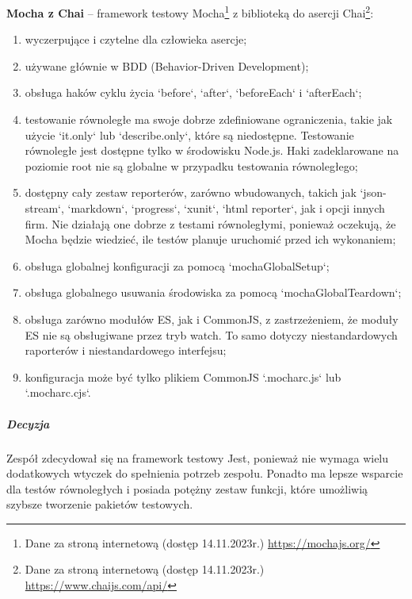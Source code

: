 \documentclass[12pt, a4paper, twoside, openany]{book}
\begin{document}
\textbf{Mocha z Chai} -- framework testowy Mocha\footnote{Dane za stroną internetową (dostęp 14.11.2023r.) \url{https://mochajs.org/}} z biblioteką do asercji Chai\footnote{Dane za stroną internetową (dostęp 14.11.2023r.) \url{https://www.chaijs.com/api/}}:
\begin{enumerate}[label=--]
    \item wyczerpujące i czytelne dla człowieka asercje;
    \item używane głównie w BDD (Behavior-Driven Development);
    \item obsługa haków cyklu życia `before`, `after`, `beforeEach` i `afterEach`;
    \item testowanie równoległe ma swoje dobrze zdefiniowane ograniczenia, takie jak użycie `it.only` lub `describe.only`, które są niedostępne. Testowanie równoległe jest dostępne tylko w środowisku Node.js. Haki zadeklarowane na poziomie root nie są globalne w przypadku testowania równoległego;
    \item dostępny cały zestaw reporterów, zarówno wbudowanych, takich jak `json-stream`, `markdown`, `progress`, `xunit`, `html reporter`, jak i opcji innych firm. Nie działają one dobrze z testami równoległymi, ponieważ oczekują, że Mocha będzie wiedzieć, ile testów planuje uruchomić przed ich wykonaniem;
    \item obsługa globalnej konfiguracji za pomocą `mochaGlobalSetup`;
    \item obsługa globalnego usuwania środowiska za pomocą `mochaGlobalTeardown`;
    \item obsługa zarówno modułów ES, jak i CommonJS, z zastrzeżeniem, że moduły ES nie są obsługiwane przez tryb watch. To samo dotyczy niestandardowych raporterów i niestandardowego interfejsu;
    \item konfiguracja może być tylko plikiem CommonJS `.mocharc.js` lub `.mocharc.cjs`.
\end{enumerate}

\subparagraph{Decyzja\\}

Zespół zdecydował się na framework testowy Jest, ponieważ nie wymaga wielu dodatkowych wtyczek do spełnienia potrzeb zespołu. Ponadto ma lepsze wsparcie dla testów równoległych i posiada potężny zestaw funkcji, które umożliwią szybsze tworzenie pakietów testowych.
\end{document}
